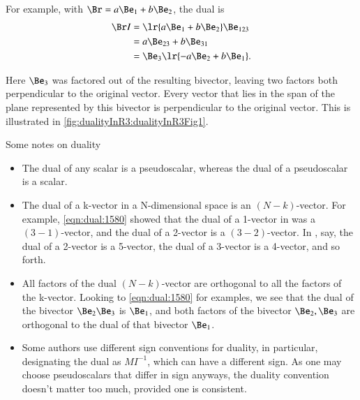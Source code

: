 For example, with \( \Br = a \Be_1 + b \Be_2 \), the dual is
\begin{equation}\label{eqn:dual:1640}
\begin{aligned}
\Br I
&= \lr{ a \Be_1 + b \Be_2 } \Be_{123} \\
&= a \Be_{23} + b \Be_{31} \\
&= \Be_3 \lr{ -a \Be_{2} + b \Be_{1} }.
\end{aligned}
\end{equation}

Here \( \Be_3 \) was factored out of the resulting bivector, leaving two factors both perpendicular to the original vector.  Every vector that lies in the span of the plane represented by this bivector is perpendicular to the original vector.
This is illustrated in \cref{fig:dualityInR3:dualityInR3Fig1}.

Some notes on duality

\begin{itemize}
\item The dual of any scalar is a pseudoscalar, whereas the dual of a pseudoscalar is a scalar.
\item The dual of a k-vector in a N-dimensional space is an \((N-k)\)-vector.
For example, \cref{eqn:dual:1580} showed that the dual of a 1-vector in  was a \((3-1)\)-vector, and the dual of a 2-vector is a \((3-2)\)-vector.  In , say, the dual of a 2-vector is a 5-vector, the dual of a 3-vector is a 4-vector, and so forth.
\item All factors of the dual \((N-k)\)-vector are orthogonal to all the factors of the k-vector.  Looking to \cref{eqn:dual:1580} for examples, we see that the dual of the bivector \( \Be_2 \Be_3 \) is \( \Be_1 \), and both factors of the bivector \( \Be_2, \Be_3 \) are orthogonal to the dual of that bivector \( \Be_1 \).
\item Some authors use different sign conventions for duality, in particular, designating the dual as \( M I^{-1} \), which can have a different sign.  As one may choose pseudoscalars that differ in sign anyways, the duality convention doesn't matter too much, provided one is consistent.
\end{itemize}

